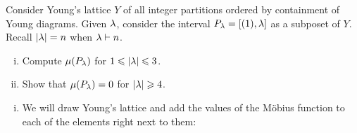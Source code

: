 \documentclass[12pt]{memoir}
\begin{document}
\begin{Ej}
    Consider Young's lattice $Y$ of all integer partitions ordered by containment of Young diagrams. Given $\la$, consider the interval $P_\la=[(1),\la]$ as a subposet of $Y$. Recall $|\la|=n$ when $\la\vdash n$.
    \vspace*{-0.4em}
    \begin{enumerate}[i)]
        \itemsep=-0.4em
        \item Compute $\mu(P_\la)$ for $1\leq|\la|\leq 3$. 
        \item Show that $\mu(P_\la)=0$ for $|\la|\geq 4$.
    \end{enumerate}
\end{Ej}

\begin{ptcbr}
    \begin{enumerate}[i)]
        \itemsep=-0.4em
        \item We will draw Young's lattice and add the values of the Möbius function to each of the elements right next to them:
        \begin{center}
            


\begin{tikzpicture}[x=0.75pt,y=0.75pt,yscale=-1,xscale=1]


\end{tikzpicture}
\end{center}
\end{enumerate}
\end{ptcbr}
\end{document}

